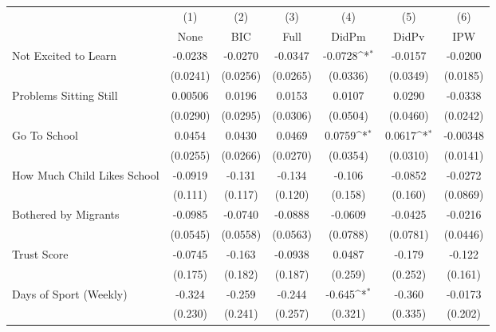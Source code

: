 {
\def\sym#1{\ifmmode^{#1}\else\(^{#1}\)\fi}
\begin{tabular}{l*{6}{c}}
\toprule
            &\multicolumn{1}{c}{(1)}&\multicolumn{1}{c}{(2)}&\multicolumn{1}{c}{(3)}&\multicolumn{1}{c}{(4)}&\multicolumn{1}{c}{(5)}&\multicolumn{1}{c}{(6)}\\
            &\multicolumn{1}{c}{None}&\multicolumn{1}{c}{BIC}&\multicolumn{1}{c}{Full}&\multicolumn{1}{c}{DidPm}&\multicolumn{1}{c}{DidPv}&\multicolumn{1}{c}{IPW}\\
\midrule
Not Excited to Learn&     -0.0238         &     -0.0270         &     -0.0347         &     -0.0728\sym{*}  &     -0.0157         &     -0.0200         \\
            &    (0.0241)         &    (0.0256)         &    (0.0265)         &    (0.0336)         &    (0.0349)         &    (0.0185)         \\
\addlinespace
Problems Sitting Still&     0.00506         &      0.0196         &      0.0153         &      0.0107         &      0.0290         &     -0.0338         \\
            &    (0.0290)         &    (0.0295)         &    (0.0306)         &    (0.0504)         &    (0.0460)         &    (0.0242)         \\
\addlinespace
Go To School&      0.0454         &      0.0430         &      0.0469         &      0.0759\sym{*}  &      0.0617\sym{*}  &    -0.00348         \\
            &    (0.0255)         &    (0.0266)         &    (0.0270)         &    (0.0354)         &    (0.0310)         &    (0.0141)         \\
\addlinespace
How Much Child Likes School&     -0.0919         &      -0.131         &      -0.134         &      -0.106         &     -0.0852         &     -0.0272         \\
            &     (0.111)         &     (0.117)         &     (0.120)         &     (0.158)         &     (0.160)         &    (0.0869)         \\
\addlinespace
Bothered by Migrants&     -0.0985         &     -0.0740         &     -0.0888         &     -0.0609         &     -0.0425         &     -0.0216         \\
            &    (0.0545)         &    (0.0558)         &    (0.0563)         &    (0.0788)         &    (0.0781)         &    (0.0446)         \\
\addlinespace
Trust Score &     -0.0745         &      -0.163         &     -0.0938         &      0.0487         &      -0.179         &      -0.122         \\
            &     (0.175)         &     (0.182)         &     (0.187)         &     (0.259)         &     (0.252)         &     (0.161)         \\
\addlinespace
Days of Sport (Weekly)&      -0.324         &      -0.259         &      -0.244         &      -0.645\sym{*}  &      -0.360         &     -0.0173         \\
            &     (0.230)         &     (0.241)         &     (0.257)         &     (0.321)         &     (0.335)         &     (0.202)         \\
\bottomrule
\end{tabular}
}
